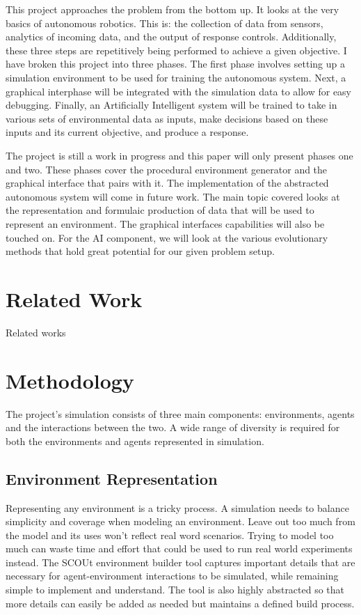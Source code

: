 \documentclass[]{report}
\begin{document}
This project approaches the problem from the bottom up. It looks at the very basics of autonomous robotics. This is: the collection of data from sensors, analytics of incoming data, and the output of response controls. Additionally, these three steps are repetitively being performed to achieve a given objective. I have broken this project into three phases. The first phase involves setting up a simulation environment to be used for training the autonomous system. Next, a graphical interphase will be integrated with the simulation data to allow for easy debugging. Finally, an Artificially Intelligent system will be trained to take in various sets of environmental data as inputs, make decisions based on these inputs and its current objective, and produce a response.

The project is still a work in progress and this paper will only present phases one and two. These phases cover the procedural environment generator and the graphical interface that pairs with it. The implementation of the abstracted autonomous system will come in future work. The main topic covered looks at the representation and formulaic production of data that will be used to represent an environment. The graphical interfaces capabilities will also be touched on. For the AI component, we will look at the various evolutionary methods that hold great potential for our given problem setup.



\chapter{Related Work}
Related works



\chapter{Methodology}
The project’s simulation consists of three main components: environments, agents and the interactions between the two. A wide range of diversity is required for both the environments and agents represented in simulation.


\section{Environment Representation}
Representing any environment is a tricky process. A simulation needs to balance simplicity and coverage when modeling an environment. Leave out too much from the model and its uses won’t reflect real word scenarios. Trying to model too much can waste time and effort that could be used to run real world experiments instead. The SCOUt environment builder tool captures important details that are necessary for agent-environment interactions to be simulated, while remaining simple to implement and understand. The tool is also highly abstracted so that more details can easily be added as needed but maintains a defined build process.
\end{document}
